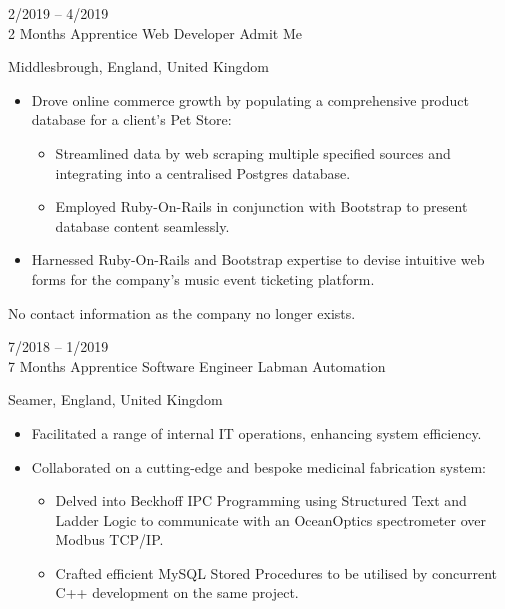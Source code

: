 \documentclass[9pt]{developercv} %
\begin{document}
\begin{entrylist}
{		\vspace{1em}
		\hspace{2em}
		\vspace{1em}
		}
	\entry
		{2/2019 -- 4/2019\\2 Months}
		{Apprentice Web Developer}
		{Admit Me}
		{Middlesbrough, England, United Kingdom
		
		\begin{itemize}
			\item[\ding{117}] Drove online commerce growth by populating a comprehensive product database for a client's Pet Store:
			\begin{itemize}
				\item[\ding{118}] Streamlined data by web scraping multiple specified sources and integrating into a centralised Postgres database.
				\item[\ding{118}] Employed Ruby-On-Rails in conjunction with Bootstrap to present database content seamlessly.
			\end{itemize}
			\item[\ding{117}] Harnessed Ruby-On-Rails and Bootstrap expertise to devise intuitive web forms for the company's music event ticketing platform.
		\end{itemize}

		\vspace{1em}
		 No contact information as the company no longer exists.
		\vspace{1em}

		}
	\entry
		{7/2018 -- 1/2019\\7 Months}
		{Apprentice Software Engineer}
		{Labman Automation}
		{Seamer, England, United Kingdom
		
		\begin{itemize}
			\item[\ding{117}] Facilitated a range of internal IT operations, enhancing system efficiency.
			\item[\ding{117}] Collaborated on a cutting-edge and bespoke medicinal fabrication system:
			\begin{itemize}
				\item[\ding{118}] Delved into Beckhoff IPC Programming using Structured Text and Ladder Logic to communicate with an OceanOptics spectrometer over Modbus TCP/IP.
				\item[\ding{118}] Crafted efficient MySQL Stored Procedures to be utilised by concurrent C++ development on the same project.
			\end{itemize}
		\end{itemize}

		\vspace{1em}
		\hspace{2em}
		\vspace{1em}
		}
		

\end{entrylist}
\end{document}
